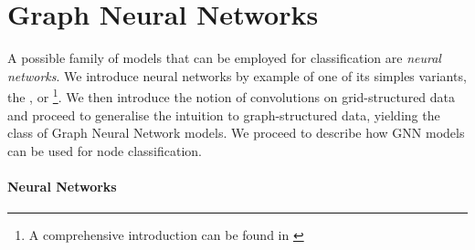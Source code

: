 \documentclass[
	fontsize=10pt, %
	twoside=false, %
	secnumdepth=1, %
  toc=indentunnumbered %
]{kaobook}
\begin{document}


\section{Graph Neural Networks}
\label{sec:neural-networks}



A possible family of models that can be employed for classification are
\textit{neural networks}. We introduce neural networks by example of one of its
simples variants, the , or 
\footnote{A comprehensive introduction can be found in
  \citeauthor{zhang_dive_nodate} \cite{zhang_dive_nodate}
}. We then introduce the notion of convolutions on grid-structured data and
proceed to generalise the intuition to graph-structured data, yielding the class
of Graph Neural Network models. We proceed to describe how GNN models can be
used for node classification.


\paragraph{Neural Networks}
\end{document}
